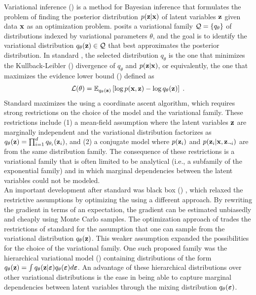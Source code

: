 \documentclass[10pt]{article}
\begin{document}
Variational inference (\vi) \citep{Jordan:1999} is a method for Bayesian inference that formulates the problem of finding the posterior distribution $p(\mathbf{z}|\mathbf{x})$ of latent variables $\mathbf{z}$ given data $\mathbf{x}$ as an optimization problem. \vi posits a variational family $\mathcal{Q}=\{q_\theta\}$ of distributions indexed by variational parameters $\theta$, and the goal is to identify the variational distribution $q_\theta(\mathbf{z})\in\mathcal{Q}$ that best approximates the posterior distribution. In standard \vi, the selected distribution $q_\theta$ is the one that minimizes the Kullback-Leibler (\kl) divergence of $q_\theta$ and $p(\mathbf{z}|\mathbf{x})$, or equivalently, the one that maximizes the evidence lower bound (\elbo) defined as
\[
\mathcal{L}(\theta) = \mathbb{E}_{q_\theta(\mathbf{z})}\left[\log p(\mathbf{x},\mathbf{z}) - \log q_\theta(\mathbf{z})\right] \;.
\]
Standard \vi maximizes the \elbo using a coordinate ascent algorithm, which requires strong restrictions on the choice of the model and the variational family. These restrictions include (1) a mean-field assumption where the latent variables $\mathbf{z}$ are marginally independent and the variational distribution factorizes as $q_\theta(\mathbf{z})=\prod_{i=1}^dq_{\theta_i}(\mathbf{z}_i)$, and (2) a conjugate model where $p(\mathbf{z}_i)$ and $p(\mathbf{z}_i|\mathbf{x},\mathbf{z}_{\neg i})$ are from the same distribution family. The consequence of these restrictions is a variational family that is often limited to be analytical (i.e., a subfamily of the exponential family) and in which marginal dependencies between the latent variables could not be modeled.
\\

An important development after standard \vi was black box \vi (\bbvi) \citep{Ranganath:2014}, which relaxed the restrictive assumptions by optimizing the \elbo using a different approach. By rewriting the \elbo gradient in terms of an expectation, the gradient can be estimated unbiasedly and cheaply using Monte Carlo samples. The optimization approach of \bbvi trades the restrictions of standard \vi for the assumption that one can sample from the variational distribution $q_\theta(\mathbf{z})$. This weaker assumption expanded the possibilities for the choice of the variational family. One such proposed family was the hierarchical variational model (\hvm) \citep{Ranganath:2016} containing distributions of the form $q_\theta(\mathbf{z}) = \int q_\theta(\mathbf{z}|\bm{\varepsilon})q_\theta(\bm{\varepsilon})d\bm{\varepsilon}$. An advantage of these hierarchical distributions over other variational distributions is the ease in being able to capture marginal dependencies between latent variables through the mixing distribution $q_\theta(\bm{\varepsilon})$.
\\
\end{document}
